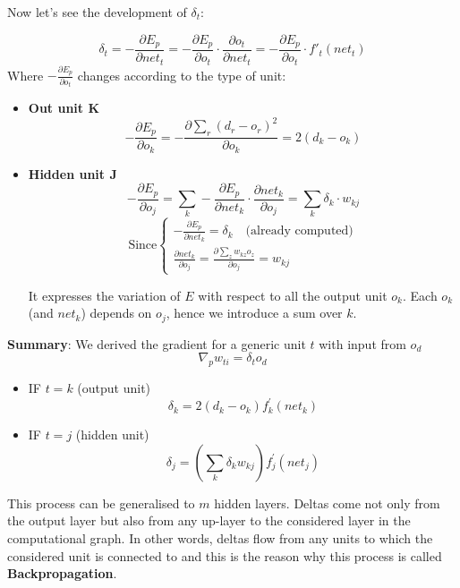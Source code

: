 \documentclass[11pt]{article}
\begin{document}
\noindent Now let's see the development of $\delta_t$:

$$\delta_t = - \frac{\partial E_p}{\partial net_t} = - \frac{\partial E_p}{\partial o_t} \cdot \frac{\partial o_t}{\partial net_t} = - \frac{\partial E_p}{\partial o_t} \cdot f'_t(net_t)$$
Where $- \frac{\partial E_p}{\partial o_t}$ changes according to the type of unit:

\begin{itemize}
    \item \textbf{Out unit K}
    $$- \frac{\partial E_p}{\partial o_k} = - \frac{\partial  \sum_{r}(d_{r}-o_{r})^2}{\partial o_{k}} = 2(d_{k}-o_{k})$$ 
    
    \item \textbf{Hidden unit J}
    $$- \frac{\partial E_p}{\partial o_j} = \sum_{k} - \frac{\partial E_p}{\partial net_k}\cdot \frac{\partial net_k}{\partial o_j} = \sum_{k} \delta_k \cdot w_{kj}$$ 
    \[
    \text{Since}\left\{
        \begin{array}{ll}
            - \frac{\partial E_p}{\partial net_k} = \delta_k \quad \text{(already computed)}\\
            \frac{\partial net_k}{\partial o_j} = \frac{\partial \sum_{z}^{}w_{kz}o_z}{\partial o_j} = w_{kj}
        \end{array}
    \right. 
\]

It expresses the variation of $E$ with respect to all the output unit $o_k$. Each $o_k$ (and $net_k$) depends on $o_j$, hence we introduce a sum over $k$.
\end{itemize}

\noindent \textbf{Summary}: We derived the gradient for a generic unit $t$ with input from $o_d$
$$ \nabla_p w_{ti} = \delta_t o_d$$
\begin{itemize}
    \item IF $t = k$ (output unit)
        \begin{equation}
            \label{eq:g_output_unit}
            \delta_k = 2(d_k - o_k)f_k^{'}(net_k)
        \end{equation}
    \item IF $t = j$ (hidden unit)
        \begin{equation}
            \label{eq:g_hidden_unit}
            \delta_j = \left( \sum_{k}^{}\delta_k w_{kj} \right) f_j^{'}(net_j)
        \end{equation}

\end{itemize}

\noindent This process can be generalised to $m$ hidden layers. Deltas come not only from the output layer but also from any up-layer to the considered layer in the computational graph. In other words, deltas flow from any units to which the considered unit is connected to and this is the reason why this process is called \textbf{Backpropagation}.
\end{document}
